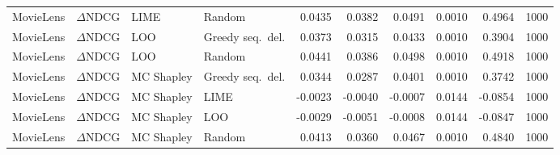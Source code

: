 \begin{longtable}{@{}p{}p{}p{}p{}rrrrrr@{}}
MovieLens & $\Delta$NDCG & LIME & Random & 0.0435 & 0.0382 & 0.0491 & 0.0010 & 0.4964 & 1000 \\
MovieLens & $\Delta$NDCG & LOO & Greedy seq.\ del. & 0.0373 & 0.0315 & 0.0433 & 0.0010 & 0.3904 & 1000 \\
MovieLens & $\Delta$NDCG & LOO & Random & 0.0441 & 0.0386 & 0.0498 & 0.0010 & 0.4918 & 1000 \\
MovieLens & $\Delta$NDCG & MC Shapley & Greedy seq.\ del. & 0.0344 & 0.0287 & 0.0401 & 0.0010 & 0.3742 & 1000 \\
MovieLens & $\Delta$NDCG & MC Shapley & LIME & -0.0023 & -0.0040 & -0.0007 & 0.0144 & -0.0854 & 1000 \\
MovieLens & $\Delta$NDCG & MC Shapley & LOO & -0.0029 & -0.0051 & -0.0008 & 0.0144 & -0.0847 & 1000 \\
MovieLens & $\Delta$NDCG & MC Shapley & Random & 0.0413 & 0.0360 & 0.0467 & 0.0010 & 0.4840 & 1000 \\
\end{longtable}
